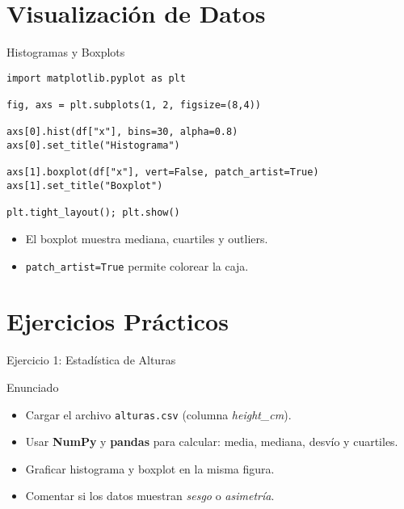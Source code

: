 \documentclass[10pt]{beamer}
\begin{document}
\section{Visualización de Datos}
\begin{frame}[fragile]{Histogramas y Boxplots}
\begin{verbatim}
import matplotlib.pyplot as plt

fig, axs = plt.subplots(1, 2, figsize=(8,4))

axs[0].hist(df["x"], bins=30, alpha=0.8)
axs[0].set_title("Histograma")

axs[1].boxplot(df["x"], vert=False, patch_artist=True)
axs[1].set_title("Boxplot")

plt.tight_layout(); plt.show()
\end{verbatim}
\begin{itemize}
  \item El boxplot muestra mediana, cuartiles y outliers.
  \item \texttt{patch\_artist=True} permite colorear la caja.
\end{itemize}
\end{frame}

\section{Ejercicios Prácticos}
\begin{frame}{Ejercicio 1: Estadística de Alturas}
  \begin{block}{Enunciado}
    \begin{itemize}
      \item Cargar el archivo \texttt{alturas.csv} (columna \emph{height\_cm}).
      \item Usar \textbf{NumPy} y \textbf{pandas} para calcular: media, mediana, desvío y cuartiles.
      \item Graficar histograma y boxplot en la misma figura.
      \item Comentar si los datos muestran \emph{sesgo} o \emph{asimetría}.
    \end{itemize}
  \end{block}
\end{frame}
\end{document}
